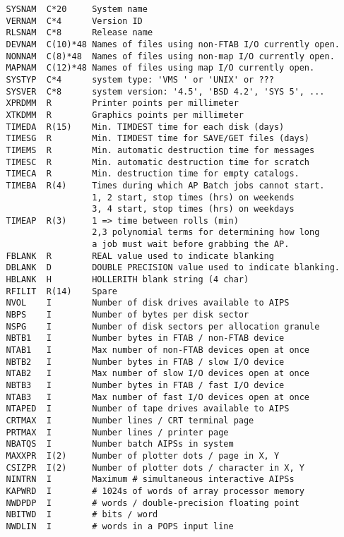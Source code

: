\begin{verbatim}
   SYSNAM  C*20     System name
   VERNAM  C*4      Version ID
   RLSNAM  C*8      Release name
   DEVNAM  C(10)*48 Names of files using non-FTAB I/O currently open.
   NONNAM  C(8)*48  Names of files using non-map I/O currently open.
   MAPNAM  C(12)*48 Names of files using map I/O currently open.
   SYSTYP  C*4      system type: 'VMS ' or 'UNIX' or ???
   SYSVER  C*8      system version: '4.5', 'BSD 4.2', 'SYS 5', ...
   XPRDMM  R        Printer points per millimeter
   XTKDMM  R        Graphics points per millimeter
   TIMEDA  R(15)    Min. TIMDEST time for each disk (days)
   TIMESG  R        Min. TIMDEST time for SAVE/GET files (days)
   TIMEMS  R        Min. automatic destruction time for messages
   TIMESC  R        Min. automatic destruction time for scratch
   TIMECA  R        Min. destruction time for empty catalogs.
   TIMEBA  R(4)     Times during which AP Batch jobs cannot start.
                    1, 2 start, stop times (hrs) on weekends
                    3, 4 start, stop times (hrs) on weekdays
   TIMEAP  R(3)     1 => time between rolls (min)
                    2,3 polynomial terms for determining how long
                    a job must wait before grabbing the AP.
   FBLANK  R        REAL value used to indicate blanking
   DBLANK  D        DOUBLE PRECISION value used to indicate blanking.
   HBLANK  H        HOLLERITH blank string (4 char)
   RFILIT  R(14)    Spare
   NVOL    I        Number of disk drives available to AIPS
   NBPS    I        Number of bytes per disk sector
   NSPG    I        Number of disk sectors per allocation granule
   NBTB1   I        Number bytes in FTAB / non-FTAB device
   NTAB1   I        Max number of non-FTAB devices open at once
   NBTB2   I        Number bytes in FTAB / slow I/O device
   NTAB2   I        Max number of slow I/O devices open at once
   NBTB3   I        Number bytes in FTAB / fast I/O device
   NTAB3   I        Max number of fast I/O devices open at once
   NTAPED  I        Number of tape drives available to AIPS
   CRTMAX  I        Number lines / CRT terminal page
   PRTMAX  I        Number lines / printer page
   NBATQS  I        Number batch AIPSs in system
   MAXXPR  I(2)     Number of plotter dots / page in X, Y
   CSIZPR  I(2)     Number of plotter dots / character in X, Y
   NINTRN  I        Maximum # simultaneous interactive AIPSs
   KAPWRD  I        # 1024s of words of array processor memory
   NWDPDP  I        # words / double-precision floating point
   NBITWD  I        # bits / word
   NWDLIN  I        # words in a POPS input line

\end{verbatim}
